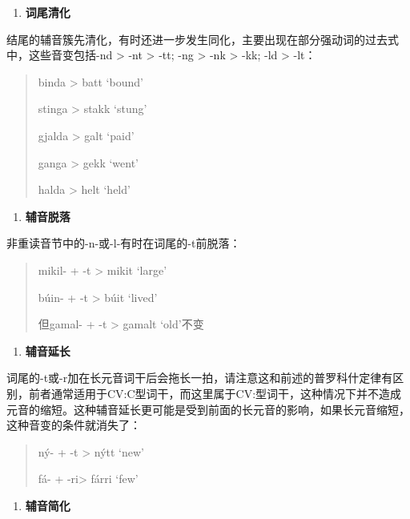 \begin{enumerate}
\def\labelenumi{\Alph{enumi}.}
\setcounter{enumi}{1}
\item
  \textbf{词尾清化}
\end{enumerate}

结尾的辅音簇先清化，有时还进一步发生同化，主要出现在部分强动词的过去式中，这些音变包括-nd
\textgreater{} -nt \textgreater{} -tt; -ng \textgreater{} -nk
\textgreater{} -kk; -ld \textgreater{} -lt：

\begin{quote}
binda \textgreater{} batt `bound'

stinga \textgreater{} stakk `stung'

gjalda \textgreater{} galt `paid'

ganga \textgreater{} gekk `went'

halda \textgreater{} helt `held'
\end{quote}

\begin{enumerate}
\def\labelenumi{\Alph{enumi}.}
\setcounter{enumi}{2}
\item
  \textbf{辅音脱落}
\end{enumerate}

非重读音节中的-n-或-l-有时在词尾的-t前脱落：

\begin{quote}
mikil- + -t \textgreater{} mikit `large'

búin- + -t \textgreater{} búit `lived'

但gamal- + -t \textgreater{} gamalt `old'不变
\end{quote}

\begin{enumerate}
\def\labelenumi{\Alph{enumi}.}
\setcounter{enumi}{3}
\item
  \label{_Ref116211616}{}\textbf{辅音延长}
\end{enumerate}

词尾的-t或-r加在长元音词干后会拖长一拍，请注意这和前述的普罗科什定律有区别，前者通常适用于CV:C型词干，而这里属于CV:型词干，这种情况下并不造成元音的缩短。这种辅音延长更可能是受到前面的长元音的影响，如果长元音缩短，这种音变的条件就消失了：

\begin{quote}
ný- + -t \textgreater{} nýtt `new'

fá- + -ri\textgreater{} fárri `few'
\end{quote}

\begin{enumerate}
\def\labelenumi{\Alph{enumi}.}
\setcounter{enumi}{4}
\item
  \label{_Ref115765758}{}\textbf{辅音简化}
\end{enumerate}

